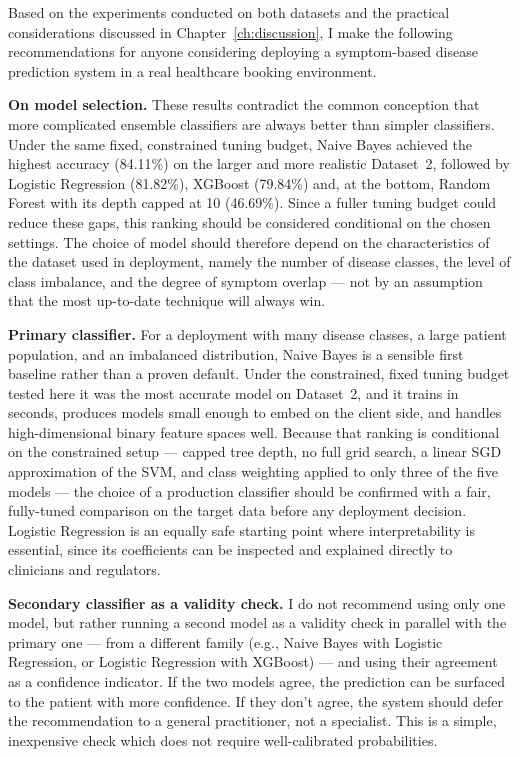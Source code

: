Based on the experiments conducted on both datasets and the practical considerations discussed in Chapter~\ref{ch:discussion}, I make the following recommendations for anyone considering deploying a symptom-based disease prediction system in a real healthcare booking environment.

\textbf{On model selection.} These results contradict the common conception that more complicated ensemble classifiers are always better than simpler classifiers. Under the same fixed, constrained tuning budget, Naive Bayes achieved the highest accuracy (84.11\%) on the larger and more realistic Dataset~2, followed by Logistic Regression (81.82\%), XGBoost (79.84\%) and, at the bottom, Random Forest with its depth capped at 10 (46.69\%). Since a fuller tuning budget could reduce these gaps, this ranking should be considered conditional on the chosen settings. The choice of model should therefore depend on the characteristics of the dataset used in deployment, namely the number of disease classes, the level of class imbalance, and the degree of symptom overlap --- not by an assumption that the most up-to-date technique will always win.

\textbf{Primary classifier.} For a deployment with many disease classes, a large patient population, and an imbalanced distribution, Naive Bayes is a sensible first baseline rather than a proven default. Under the constrained, fixed tuning budget tested here it was the most accurate model on Dataset~2, and it trains in seconds, produces models small enough to embed on the client side, and handles high-dimensional binary feature spaces well. Because that ranking is conditional on the constrained setup --- capped tree depth, no full grid search, a linear SGD approximation of the SVM, and class weighting applied to only three of the five models --- the choice of a production classifier should be confirmed with a fair, fully-tuned comparison on the target data before any deployment decision. Logistic Regression is an equally safe starting point where interpretability is essential, since its coefficients can be inspected and explained directly to clinicians and regulators.

\textbf{Secondary classifier as a validity check.} I do not recommend using only one model, but rather running a second model as a validity check in parallel with the primary one --- from a different family (e.g., Naive Bayes with Logistic Regression, or Logistic Regression with XGBoost) --- and using their agreement as a confidence indicator. If the two models agree, the prediction can be surfaced to the patient with more confidence. If they don't agree, the system should defer the recommendation to a general practitioner, not a specialist. This is a simple, inexpensive check which does not require well-calibrated probabilities.

